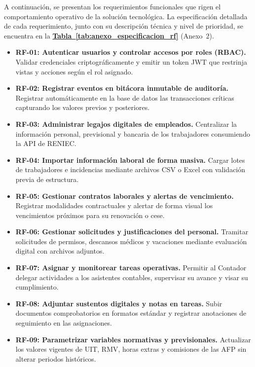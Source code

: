 
A continuación, se presentan los requerimientos funcionales que rigen el comportamiento operativo de la solución tecnológica. 
La especificación detallada de cada requerimiento, junto con su descripción técnica y nivel de prioridad, 
se encuentra en la \textbf{\hyperref[tab:anexo_especificacion_rf]{Tabla~\ref{tab:anexo_especificacion_rf}}} (Anexo~2).

\begin{itemize}
    \item \textbf{RF-01: Autenticar usuarios y controlar accesos por roles (RBAC).} Validar credenciales criptográficamente y emitir un token JWT que restrinja vistas y acciones según el rol asignado.
    \item \textbf{RF-02: Registrar eventos en bitácora inmutable de auditoría.} Registrar automáticamente en la base de datos las transacciones críticas capturando los valores previos y posteriores.
    \item \textbf{RF-03: Administrar legajos digitales de empleados.} Centralizar la información personal, previsional y bancaria de los trabajadores consumiendo la API de RENIEC.
    \item \textbf{RF-04: Importar información laboral de forma masiva.} Cargar lotes de trabajadores e incidencias mediante archivos CSV o Excel con validación previa de estructura.
    \item \textbf{RF-05: Gestionar contratos laborales y alertas de vencimiento.} Registrar modalidades contractuales y alertar de forma visual los vencimientos próximos para su renovación o cese.
    \item \textbf{RF-06: Gestionar solicitudes y justificaciones del personal.} Tramitar solicitudes de permisos, descansos médicos y vacaciones mediante evaluación digital con archivos adjuntos.
    \item \textbf{RF-07: Asignar y monitorear tareas operativas.} Permitir al Contador delegar actividades a los asistentes contables, supervisar su avance y visar su cumplimiento.
    \item \textbf{RF-08: Adjuntar sustentos digitales y notas en tareas.} Subir documentos comprobatorios en formatos estándar y registrar anotaciones de seguimiento en las asignaciones.
    \item \textbf{RF-09: Parametrizar variables normativas y previsionales.} Actualizar los valores vigentes de UIT, RMV, horas extras y comisiones de las AFP sin alterar periodos históricos.

\end{itemize}
